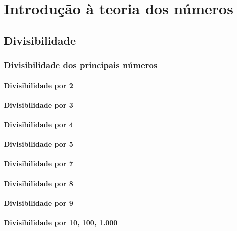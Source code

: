 \chapter[Introdução à teoria dos números]{Introdução à teoria dos números}

\section{Divisibilidade}

\subsection{Divisibilidade dos principais números}

\subsubsection{Divisibilidade por 2}

\subsubsection{Divisibilidade por 3}

\subsubsection{Divisibilidade por 4}

\subsubsection{Divisibilidade por 5}

\subsubsection{Divisibilidade por 7}

\subsubsection{Divisibilidade por 8}

\subsubsection{Divisibilidade por 9}

\subsubsection{Divisibilidade por 10, 100, 1.000}

